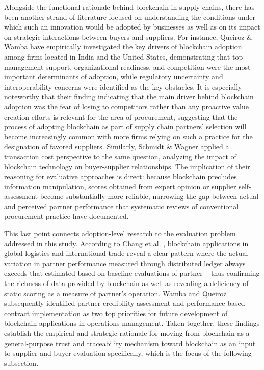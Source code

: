 \documentclass[11pt]{article}
\begin{document}
Alongside the functional rationale behind blockchain in supply chains, there has been another strand of literature focused on understanding the conditions under which such an innovation would be adopted by businesses as well as on its impact on strategic interactions between buyers and suppliers. For instance, Queiroz \& Wamba \cite{ref56} have empirically investigated the key drivers of blockchain adoption among firms located in India and the United States, demonstrating that top management support, organizational readiness, and competition were the most important determinants of adoption, while regulatory uncertainty and interoperability concerns were identified as the key obstacles. It is especially noteworthy that their finding indicating that the main driver behind blockchain adoption was the fear of losing to competitors rather than any proactive value creation efforts is relevant for the area of procurement, suggesting that the process of adopting blockchain as part of supply chain partners' selection will become increasingly common with more firms relying on such a practice for the designation of favored suppliers. Similarly, Schmidt \& Wagner \cite{ref57} applied a transaction cost perspective to the same question, analyzing the impact of blockchain technology on buyer-supplier relationships. The implication of their reasoning for evaluative approaches is direct: because blockchain precludes information manipulation, scores obtained from expert opinion or supplier self-assessment become substantially more reliable, narrowing the gap between actual and perceived partner performance that systematic reviews of conventional procurement practice have documented. 


This last point connects adoption-level research to the evaluation problem addressed in this study. According to Chang et al. \cite{ref60}, blockchain applications in global logistics and international trade reveal a clear pattern where the actual variation in partner performance measured through distributed ledger always exceeds that estimated based on baseline evaluations of partner -- thus confirming the richness of data provided by blockchain as well as revealing a deficiency of static scoring as a measure of partner's operation. Wamba and Queiroz \cite{ref66}  subsequently identified partner credibility assessment and performance-based contract implementation as two top priorities for future development of blockchain applications in operations management. Taken together, these findings establish the empirical and strategic rationale for moving from blockchain as a general-purpose trust and traceability mechanism toward blockchain as an input to supplier and buyer evaluation specifically, which is the focus of the following subsection.
\end{document}
